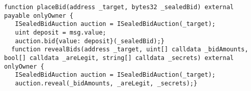 \begin{lstlisting}[language=Solidity]
  function placeBid(address _target, bytes32 _sealedBid) external payable onlyOwner {
   ISealedBidAuction auction = ISealedBidAuction(_target);
   uint deposit = msg.value;
   auction.bid{value: deposit}(_sealedBid);}
  function revealBids(address _target, uint[] calldata _bidAmounts, bool[] calldata _areLegit, string[] calldata _secrets) external onlyOwner {
   ISealedBidAuction auction = ISealedBidAuction(_target);
   auction.reveal(_bidAmounts, _areLegit, _secrets);}
\end{lstlisting}